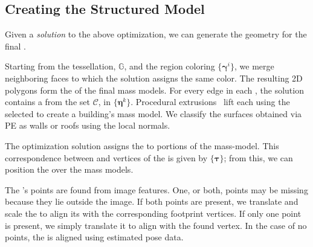 \subsection{Creating the Structured Model}
\label{sec:post}

Given a \emph{solution} to the above optimization, we can generate the geometry for the final \outputM. 





Starting from the \groundplane tessellation, $\mathbb{G}$, and the region coloring $\{\mathbold{\gamma}^i\}$, we merge neighboring faces to which the solution assigns the same color. The resulting 2D polygons form the \footprintpolygons of the final mass models.
%
For every edge in each \footprintpolygon, the solution contains a \cleanprofile from the set $\mathcal{C}$, in  $\{\mathbold{\eta}^k\}$. Procedural extrusions~\cite{kelly2011interactive} lift each \footprintpolygon using the selected \cleanprofiles to create a building's mass model. 
We classify the surfaces obtained via PE as walls or roofs using the local normals.

The optimization solution assigns the \buildingfacades to portions of the mass-model. This correspondence between \buildingfacadepoints and vertices of the \footprintpolygons is given by $\{\mathbold{\tau}\}$; from this, we can position the \buildingfacades over the mass models.

The \buildingfacade's points are found from image features. One, or both, points may be missing because they lie outside the image. If both points are present, we translate and scale the \buildingfacade to align its \buildingfacadepoints with the corresponding footprint vertices. If only one point is present, we simply translate it to align with the found vertex. In the case of no points, the \buildingfacade is aligned using estimated \GSV pose data.



